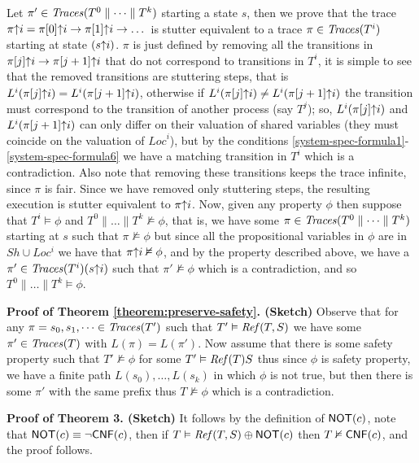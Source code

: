 	Let $\pi' \in \mathit{Traces}(T^0 \parallel \dots \parallel T^k)$ starting a state $s$, then we prove that the trace $\pi \mathord{\uparrow} i = \pi[0] \mathord{\uparrow} i \rightarrow \pi[1] \mathord{\uparrow} i \rightarrow \dots$ is stutter equivalent to a trace 
$\pi \in \mathit{Traces}(T^i)$ starting at state $(s \mathord{\uparrow} i )$. $\pi$ is just defined by removing all the transitions in $\pi[j] \mathord{\uparrow} i \rightarrow \pi[j+1] \mathord{\uparrow} i$  that
do not correspond to transitions in $T^i$, it is simple to see that the removed transitions are stuttering steps, that is $L^i(\pi[j] \mathord{\uparrow} i)  = L^i(\pi[j+1] \mathord{\uparrow} i)$, otherwise if $L^i(\pi[j] \mathord{\uparrow} i)  \neq L^i(\pi[j+1] \mathord{\uparrow} i)$
the transition must correspond to the transition of another process (say $T^j$); so, $L^i(\pi[j] \mathord{\uparrow} i)$ and $L^i(\pi[j+1] \mathord{\uparrow} i)$ can only differ on their valuation of shared variables (they must coincide on the valuation of $\textit{Loc}^i$), but by the conditions \ref{system-spec-formula1}-\ref{system-spec-formula6} we have a matching transition in $T^i$ which is a contradiction. Also note that removing these transitions keeps the trace infinite, since $\pi$ is fair.
	Since we have removed only stuttering steps, the resulting execution is stutter equivalent to $\pi \mathord{\uparrow} i$. Now, given any {\LTLX} property $\phi$ then suppose
that $T^i \vDash \phi$ and $T^0 \parallel \dots \parallel T^k \nvDash  \phi$, that is, we have some $\pi \in \mathit{Traces}(T^0 \parallel \dots \parallel T^k)$ starting at $s$ such that
$\pi \nvDash \phi$ but since all the propositional variables in $\phi$ are in $Sh \cup Loc^i$ we have that $\pi \mathord{\uparrow} i \nvDash \phi$, and by the property described above,
we have a $\pi' \in \mathit{Traces}(T^i)(s \mathord{\uparrow} i)$ such that $\pi' \nvDash \phi$ which is a contradiction, and so $T^0 \parallel \dots \parallel T^k \vDash  \phi$.

\noindent  \textbf{Proof of Theorem \ref{theorem:preserve-safety}.  (Sketch)} %
	Observe that for any $\pi=s_0,s_1,\dots \in \mathit{Traces}(T')$ such that $T' \vDash \mathit{Ref}(T,S)$ we have some $\pi' \in \mathit{Traces}(T)$ with $L(\pi) = L(\pi')$. Now assume that there is
some safety property such that $T' \nvDash \phi$ for some $T' \vDash \mathit{Ref}(T){S}$ thus since $\phi$ is  safety property, we have a finite path $L(s_0),\dots,L(s_k)$ in which $\phi$
is not true, but then there is some $\pi'$ with the same prefix thus $T \nvDash \phi$ which is a contradiction.	
	
\noindent \textbf{Proof of Theorem 3. (Sketch)} It follows by the definition of $\mathsf{NOT}{(c)}$, note that $\mathsf{NOT}{(c)}  \equiv \neg \mathsf{CNF}{(c)}$, then 
if $T \vDash \mathit{Ref}(T, S)\oplus \mathsf{NOT}{(c)}$ then $T \nvDash \mathsf{CNF}{(c)}$, and the proof follows.

